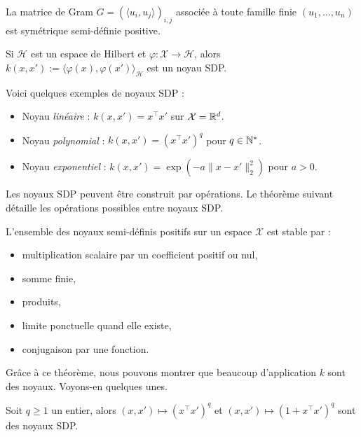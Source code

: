 \begin{prop}
    La matrice de Gram $ G = \left(\bigl\langle u_i, u_j\bigr\rangle\right)_{i,j}$ associée à toute famille finie $ (u_1, \dots, u_n)$ est symétrique semi-définie positive.
\end{prop}

\begin{proposition}
    Si $\mathcal{H}$ est un espace de Hilbert et $\varphi : \mathcal{X} \to \mathcal{H}$, alors $k(x, x') := \langle \varphi(x), \varphi(x') \rangle_{\mathcal{H}}$ est un noyau SDP.
\end{proposition}

\begin{example}
    Voici quelques exemples de noyaux SDP : 
    \begin{itemize}
        \item Noyau \emph{linéaire} : $ k(x, x') = x^\top x'$ sur $ \mathcal{X} = \mathbb{R}^d$. 
        \item Noyau \emph{polynomial} : $ k(x, x') = (x^\top x')^q$ pour $ q \in \mathbb{N}^*$. 
        \item Noyau \emph{exponentiel} : $ k(x, x') = \exp \left(- a \| x - x'\|_2^2 \right)$ pour $ a > 0$. 
    \end{itemize}
\end{example}

Les noyaux SDP peuvent être construit par opérations. Le théorème suivant détaille les opérations possibles entre noyaux SDP. 

\begin{theorem}[Opérations]
    L'ensemble des noyaux semi-définis positifs sur un espace $ \mathcal{X}$ est stable par : 
    \begin{itemize}
        \item multiplication scalaire par un coefficient positif ou nul, 
        \item somme finie, 
        \item produits, 
        \item limite ponctuelle quand elle existe, 
        \item conjugaison par une fonction. 
    \end{itemize}
\end{theorem}

Grâce à ce théorème, nous pouvons montrer que beaucoup d'application $k$ sont des noyaux. Voyons-en quelques unes. 

\begin{proposition}
    Soit $ q \geqslant 1$ un entier, alors $(x, x') \longmapsto (x^\top x')^q$ et $(x, x') \longmapsto (1 + x^\top x')^q$ sont des noyaux SDP. 
\end{proposition}

